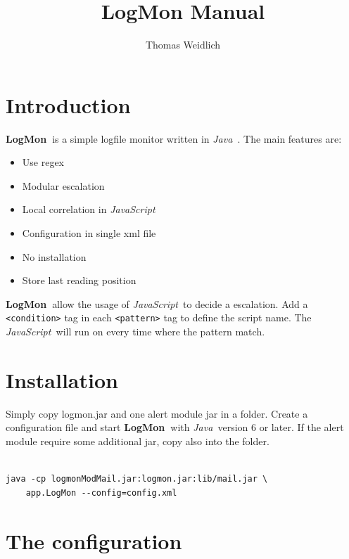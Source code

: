 \documentclass[11pt,a4paper]{article}
\title{LogMon Manual}
\author{Thomas Weidlich}
\newcommand{\logmon}{\textbf{LogMon\ }}
\newcommand{\js}{\textit{JavaScript\ }}
\newcommand{\java}{\textit{Java\ }}
\begin{document}
\maketitle
\tableofcontents
\newpage
\section{Introduction}

\logmon is a simple logfile monitor written in \java. The main features are:

\begin{itemize}
  \item Use regex
  \item Modular escalation
  \item Local correlation in \js
  \item Configuration in single xml file
  \item No installation
  \item Store last reading position
\end{itemize}

\logmon allow the usage of \js to decide a escalation. Add a
\verb#<condition># tag in each \verb#<pattern># tag to define the script name.
The \js will run on every time where the pattern match.

\section{Installation}

Simply copy logmon.jar and one alert module jar in a folder. Create a
configuration file and start \logmon with \java version 6 or later. If the
alert module require some additional jar, copy also into the folder.

\begin{verbatim}

java -cp logmonModMail.jar:logmon.jar:lib/mail.jar \
    app.LogMon --config=config.xml

\end{verbatim}

\section{The configuration}
\label{sec:conf}
\end{document}
